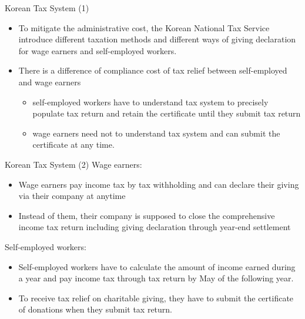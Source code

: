 \documentclass[
  ignorenonframetext,
  aspectratio=169,
]{beamer}
\providecommand{\tightlist}{%
  \setlength{\itemsep}{0pt}\setlength{\parskip}{0pt}}
\begin{document}
\begin{frame}{Korean Tax System (1)}
\protect\hypertarget{korean-tax-system-1}{}
\begin{itemize}
\tightlist
\item
  To mitigate the administrative cost, the Korean National Tax Service introduce different taxation methods and different ways of giving declaration for wage earners and self-employed workers.
\item
  There is a difference of compliance cost of tax relief between self-employed and wage earners

  \begin{itemize}
  \tightlist
  \item
    self-employed workers have to understand tax system to precisely populate tax return and retain the certificate until they submit tax return
  \item
    wage earners need not to understand tax system and can submit the certificate at any time.
  \end{itemize}
\end{itemize}
\end{frame}

\begin{frame}{Korean Tax System (2)}
\protect\hypertarget{korean-tax-system-2}{}
Wage earners:

\begin{itemize}
\tightlist
\item
  Wage earners pay income tax by tax withholding and can declare their giving via their company at anytime
\item
  Instead of them, their company is supposed to close the comprehensive income tax return including giving declaration through year-end settlement
\end{itemize}

Self-employed workers:

\begin{itemize}
\tightlist
\item
  Self-employed workers have to calculate the amount of income earned during a year and pay income tax through tax return by May of the following year.
\item
  To receive tax relief on charitable giving, they have to submit the certificate of donations when they submit tax return.
\end{itemize}
\end{frame}
\end{document}

